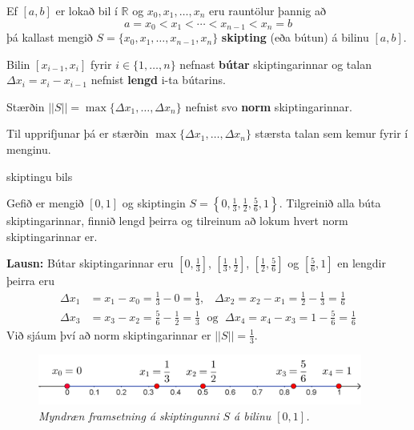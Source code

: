 \if {}

\begin{skilgr}{}
Ef $[a,b]$ er lokað bil í $\mathbb{R}$ og $x_{0},x_{1},\ldots,x_{n}$ eru rauntölur þannig að
$$
a = x_{0} < x_{1} < \cdots < x_{n-1} < x_{n} = b
$$
þá kallast mengið $S = \{x_{0},x_{1},\ldots,x_{n-1},x_{n}\}$ \textbf{skipting} (eða bútun) á bilinu $[a,b]$.

\vspace{2mm}

Bilin $[x_{i-1},x_{i}]$ fyrir $i \in \{1,\ldots,n\}$ nefnast \textbf{bútar} skiptingarinnar og talan $\Delta x_{i} = x_{i}-x_{i-1}$ nefnist \textbf{lengd} i-ta bútarins.

\vspace{2mm}

\noindent Stærðin $||S|| = \max\{\Delta x_{1},\ldots,\Delta x_{n}\}$ nefnist svo \textbf{norm} skiptingarinnar.
\end{skilgr}

\begin{ath}
Til upprifjunar þá er stærðin $\max\{\Delta x_{1},\ldots,\Delta x_{n}\}$ stærsta talan sem kemur fyrir í menginu.
\end{ath}

\begin{syn}{skiptingu bils}

Gefið er mengið $[0,1]$ og skiptingin $S = \left\{0,\frac{1}{3},\frac{1}{2},\frac{5}{6},1\right\}$. Tilgreinið alla búta skiptingarinnar, finnið lengd þeirra og tilreinum að lokum hvert norm skiptingarinnar er.

\vspace{2mm}

{\bf Lausn:} Bútar skiptingarinnar eru $\left[0,\frac{1}{3}\right]$, $\left[\frac{1}{3},\frac{1}{2}\right]$, $\left[\frac{1}{2},\frac{5}{6}\right]$ og $\left[\frac{5}{6},1\right]$ en lengdir þeirra eru
\setlength{\jot}{4mm}
\begin{align*}
\Delta x_{1} &= x_{1}-x_{0} = \frac{1}{3} - 0 = \frac{1}{3}, \;\;\; \Delta x_{2} = x_{2}-x_{1} = \frac{1}{2} - \frac{1}{3} = \frac{1}{6}\\ \Delta x_{3} &= x_{3}-x_{2} = \frac{5}{6} - \frac{1}{2} = \frac{1}{3} \; \text{ og } \; \Delta x_{4} = x_{4}-x_{3} = 1 - \frac{5}{6} = \frac{1}{6}
\end{align*}
Við sjáum því að norm skiptingarinnar er $||S|| = \frac{1}{3}$.

\begin{figure}[h]
\center
\includegraphics[width=0.95\textwidth]{Pictures/k2m1.png}
\caption{\it Myndræn framsetning á skiptingunni $S$ á bilinu $[0,1]$.}
\end{figure}

\end{syn}


